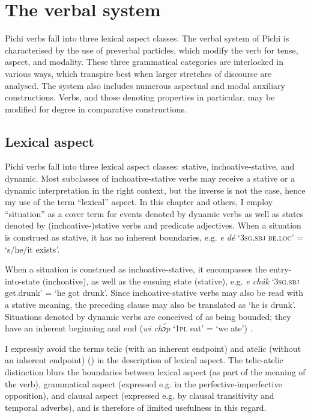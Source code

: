 \chapter{The verbal system}

Pichi verbs fall into three lexical aspect classes. The verbal system of Pichi is characterised by the use of preverbal particles, which modify the verb for tense, aspect, and modality. These three grammatical categories are interlocked in various ways, which transpire best when larger stretches of discourse are analysed. The system also includes numerous aspectual and modal auxiliary constructions. Verbs, and those denoting properties in particular, may be modified for degree in comparative constructions.

\section{Lexical aspect}\label{sec:6.1}

Pichi verbs fall into three lexical aspect classes: stative, inchoative-stative, and dynamic. Most subclasses of inchoative-stative verbs may receive a stative or a dynamic interpretation in the right context, but the inverse is not the case, hence my use of the term “lexical” aspect. In this chapter and others, I employ “situation” as a cover term for events denoted by dynamic verbs as well as states denoted by (inchoative-)stative verbs and predicate adjectives. When a situation is construed as stative, it has no inherent boundaries, e.g. \textit{e dé} ‘\textsc{3sg.sbj} \textsc{be.loc}’ = ‘s/he/it exists’. 


When a situation is construed as inchoative-stative, it encompasses the entry-into-state (inchoative), as well as the ensuing state (stative), e.g. \textit{e chák} ‘\textsc{3sg.sbj} get.drunk’ = ‘he got drunk’. Since inchoative-stative verbs may also be read with a stative meaning, the preceding clause may also be translated as ‘he is drunk’. Situations denoted by dynamic verbs are conceived of as being bounded; they have an inherent beginning and end (\textit{wi chɔ́p} ‘\textsc{1pl} eat’ = ‘we ate’) \citep{Sasse1991}.



I expressly avoid the terms telic (with an inherent endpoint) and atelic (without an inherent endpoint) (\citealt[44–51]{Comrie1976}) in the description of lexical aspect. The telic-atelic distinction blurs the boundaries between lexical aspect (as part of the meaning of the verb), grammatical aspect (expressed e.g. in the perfective-imperfective opposition), and clausal aspect (expressed e.g. by clausal transitivity and temporal adverbs), and is therefore of limited usefulness in this regard. 



